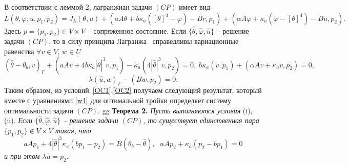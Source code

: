 В соответствии с леммой 2, лагранжиан задачи $(CP)$ имеет вид
\[
    L(\theta, \varphi, u, p_1, p_2) = J_\lambda(\theta, u)
    + (aA\theta + b\kappa_a([\theta]^4 - \varphi) - Br, p_1)
    + (\alpha A \varphi + \kappa_a(\varphi - [\theta]^4) - Bu, p_2).
\]
Здесь $p=\{p_1,p_2\}\in V\times V$ -- сопряженное состояние.
Если $\{\hat{\theta}, \hat{\varphi}, \hat{u} \}$ -- решение задачи $(CP)$, то
в силу принципа Лагранжа~\cite[Теорема 1.5]{10} справедливы вариационные равенства
$\forall v\in V,\, w\in U$
\begin{equation}
    \label{OC1}
    (\hat{\theta} -\theta_b, v)_\Gamma + (aAv + 4 b\kappa_a |\hat{\theta}|^3v, p_1)
    - \kappa_a ( 4 |\hat{\theta}|^3v, p_2) = 0,\;
    b \kappa_a (v, p_1)+ (\alpha A v + \kappa_a v, p_2) = 0,
\end{equation}
\begin{equation}
    \label{OC2}
    \lambda(\hat{u},w)_\Gamma - (Bw, p_2) = 0.
\end{equation}
Таким образом, из условий~\eqref{OC1},\eqref{OC2}
получаем следующий результат, который вместе с уравнениями \eqref{w1}
для оптимальной тройки определяет систему оптимальности задачи $(CP)$.
gg
\textbf{Теорема 2.}
\textit{Пусть выполняются условия} (i),(ii).
\textit{Если $\{\hat{\theta}, \hat{\varphi}, \hat{u}\}$ -- решение
задачи $(CP)$, то существует единственная пара $\{p_1, p_2 \} \in V\times V$
    такая, что}
\begin{equation}
    \label{AS}
    aAp_1 +4|\hat{\theta}|^3 \kappa_a(bp_1 - p_2) = B(\theta_b - \hat{\theta}), \;\;
    \alpha A p_2 + \kappa_a (p_2 - b p_1)=0
\end{equation}
\textit{и при этом} $\lambda\hat{u} = p_2.$




